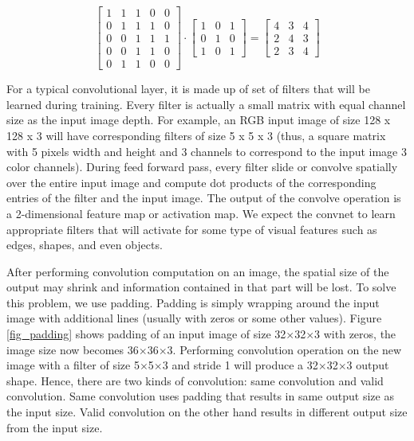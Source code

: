 \documentclass[master]{thesis-uestc}
\begin{document}
\begin{equation}
\begin{bmatrix}
1 & 1 & 1 & 0 & 0 \\
0 & 1 & 1 & 1 & 0 \\
0 & 0 & 1 & 1 & 1 \\
0 & 0 & 1 & 1 & 0 \\
0 & 1 & 1 & 0 & 0
\end{bmatrix}
\cdot
\begin{bmatrix}
1 & 0 & 1 \\
0 & 1 & 0 \\
1 & 0 & 1
\end{bmatrix}
=
\begin{bmatrix}
4 & 3 & 4 \\
2 & 4 & 3 \\
2 & 3 & 4
\end{bmatrix}
\label{conv_operation}
\end{equation}

For a typical convolutional layer, it is made up of set of filters that will be learned during training. Every filter is actually a small matrix with equal channel size as the input image depth. For example, an RGB input image of size 128 x 128 x 3 will have corresponding filters of size 5 x 5 x 3 (thus, a square matrix with 5 pixels width and height and 3 channels to correspond to the input image 3 color channels). During feed forward pass, every filter slide or convolve spatially over the entire input image and compute dot products of the corresponding entries of the filter and the input image. The output of the convolve operation is a 2-dimensional feature map or activation map. We expect the convnet to learn appropriate filters that will activate for some type of visual features such as edges, shapes, and even objects.   

After performing convolution computation on an image, the spatial size of the output may shrink and information contained in that part will be lost. To solve this problem, we use padding. Padding is simply wrapping around the input image with additional lines (usually with zeros or some other values). Figure \ref{fig_padding} shows padding of an input image of size 32$\times$32$\times$3 with zeros, the image size now becomes 36$\times$36$\times$3. Performing convolution operation on the new image with a filter of size 5$\times$5$\times$3 and stride 1 will produce a 32$\times$32$\times$3 output shape. Hence, there are two kinds of convolution: same convolution and valid convolution. Same convolution uses padding that results in same output size as the input size. Valid convolution on the other hand results in different output size from the input size.
\end{document}
